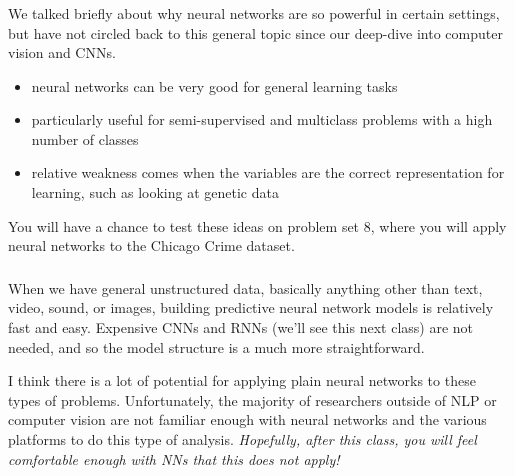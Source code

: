 \documentclass[xetex,mathserif,serif,aspectratio=169]{beamer}
\begin{document}
\begin{frame}[fragile] \frametitle{} \oldB \small


We talked briefly about why neural networks are so powerful
in certain settings, but have not circled back to this general
topic since our deep-dive into computer vision and CNNs.
\begin{itemize}
\item neural networks can be very good for general learning tasks
\item particularly useful for semi-supervised and multiclass
  problems with a high number of classes
\item relative weakness comes when the variables are the correct
  representation for learning, such as looking at genetic data
\end{itemize}
\pause You will have a chance to test these ideas on problem set 8,
where you will apply neural networks to the Chicago Crime dataset.

\end{frame}

\begin{frame}[fragile] \frametitle{} \oldB \small


When we have general unstructured data, basically anything other
than text, video, sound, or images, building predictive neural
network models is relatively fast and easy. Expensive CNNs and RNNs
(we'll see this next class) are not needed, and so the model structure
is a much more straightforward.

I think there is a lot of potential for applying plain neural networks
to these types of problems. Unfortunately, the majority of researchers
outside of NLP or computer vision are not familiar enough with neural
networks and the various platforms to do this type of analysis.
\textit{Hopefully, after this class, you will feel comfortable enough
with NNs that this does not apply!}

\end{frame}
\end{document}
